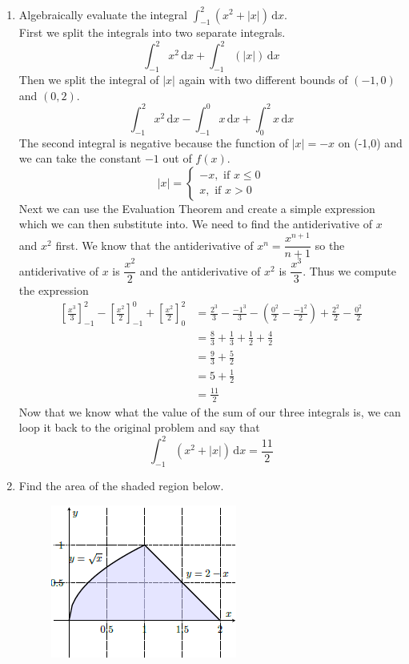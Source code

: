 \documentclass{article}
\begin{document}
\begin{enumerate}[label=\textbf{(1.\arabic*)}]
\newpage %

\item Algebraically evaluate the integral ${\displaystyle \int_{-1}^2\!\left(x^2+|x|\right)\,\text{d}x }$. \\ %
\newline
First we split the integrals into two separate integrals.
\[\int_{-1}^2\! x^2 \, \text{d}x+\int_{-1}^2\!\left(|x|\right)\,\text{d}x\]
Then we split the integral of $|x|$ again with two different bounds of $(-1,0)$ and $(0,2)$.
\[\int_{-1}^2\! x^2 \, \text{d}x-\int_{-1}^0\!x\,\text{d}x+\int_0^2\!x\,\text{d}x\]
The second integral is negative because the function of $|x|=-x$ on (-1,0) and we can take the constant $-1$ out of $f(x)$. 
\[|x| = \begin{cases}
-x, \text{ if } x \le 0 \\
x, \text{     if } x > 0
\end{cases} \]
Next we can use the Evaluation Theorem and create a simple expression which we can then substitute into. We need to find the antiderivative of $x$ and $x^2$ first. We know that the antiderivative of $x^n=\dfrac{x^{n+1}}{n+1}$ so the antiderivative of $x$ is $\dfrac{x^2}{2}$ and the antiderivative of $x^2$ is $\dfrac{x^3}{3}$. Thus we compute the expression
\begin{align*}
\left[\frac{x^3}{3}\right]_{-1}^2-\left[\frac{x^2}{2}\right]_{-1}^0+\left[\frac{x^2}{2}\right]_0^2&=\frac{2^3}{3}-\frac{{-1}^3}{3}-\left(\frac{0^2}{2}-\frac{{-1}^2}{2}\right)+\frac{2^2}{2}-\frac{0^2}{2} \\
&=\frac{8}{3}+\frac{1}{3}+\frac{1}{2}+\frac{4}{2} \\
&=\frac{9}{3}+\frac{5}{2} \\
&=5+\frac{1}{2} \\
&=\frac{11}{2}
\end{align*}
Now that we know what the value of the sum of our three integrals is, we can loop it back to the original problem and say that
\[\int_{-1}^2\!\left(x^2+|x|\right)\,\text{d}x=\frac{11}{2}\]

\newpage %

\item Find the area of the shaded region below. %
\begin{figure}[H]
  \centering
  \includegraphics{twoIntegral}
\end{figure}
\begin{enumerate}[label=\textbf{(\alph*)}]


\end{enumerate}
\end{enumerate}
\end{document}

